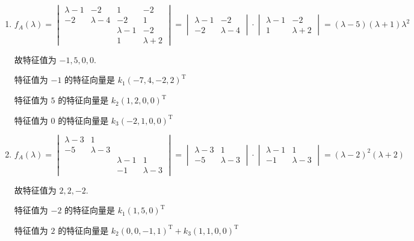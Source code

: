 	 \paragraph{} %
		 \begin{enumerate}
			 \item %
			       \( f_{A}(\lambda) = \begin{vmatrix}
				       \lambda - 1 & -2          & 1           & -2          \\
				       -2          & \lambda - 4 & -2          & 1           \\
				                   &             & \lambda - 1 & -2          \\
				                   &             & 1           & \lambda + 2
			       \end{vmatrix} = \begin{vmatrix}
				       \lambda - 1 & -2          \\
				       -2          & \lambda - 4
			       \end{vmatrix} \cdot \begin{vmatrix}
				       \lambda - 1 & -2          \\
				       1           & \lambda + 2
			       \end{vmatrix} = (\lambda - 5)(\lambda + 1)\lambda^{2} \)

			       故特征值为 \( -1, 5, 0, 0 \).

			       特征值为 \( -1 \) 的特征向量是 \( k_{1}(-7, 4, -2, 2)^{\mathrm{T}} \)

			       特征值为 \( 5 \) 的特征向量是 \( k_{2}(1, 2, 0, 0)^{\mathrm{T}} \)

			       特征值为 \( 0 \) 的特征向量是 \( k_{3}(-2, 1, 0, 0)^{\mathrm{T}} \)
			 \item %
			       \( f_{A}(\lambda) = \begin{vmatrix}
				       \lambda - 3 & 1           &           &           \\
				       -5          & \lambda - 3 &           &           \\
				                   &             & \lambda-1 & 1         \\
				                   &             & -1        & \lambda-3
			       \end{vmatrix} = \begin{vmatrix}
				       \lambda - 3 & 1           \\
				       -5          & \lambda - 3
			       \end{vmatrix} \cdot \begin{vmatrix}
				       \lambda - 1 & 1           \\
				       -1          & \lambda - 3
			       \end{vmatrix} = (\lambda - 2)^{2}(\lambda + 2) \)

			       故特征值为 \( 2, 2, -2 \).

			       特征值为 \( -2 \) 的特征向量是 \( k_{1}(1, 5, 0)^{\mathrm{T}} \)

			       特征值为 \( 2 \) 的特征向量是 \( k_{2}(0, 0, -1, 1)^{\mathrm{T}} + k_{3}(1, 1, 0, 0)^{\mathrm{T}} \)
		 \end{enumerate}


